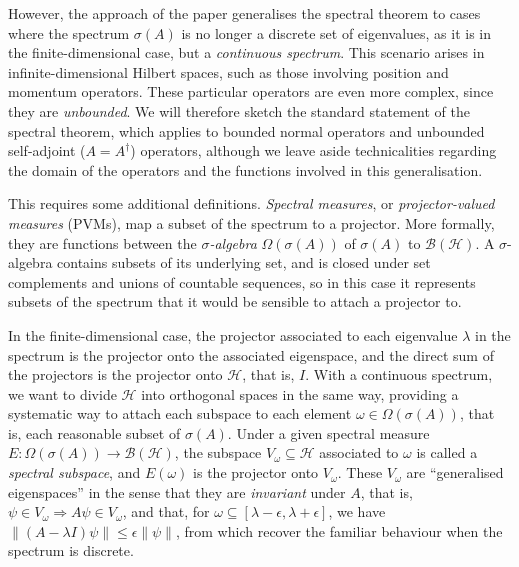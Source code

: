 \documentclass[10pt, a4paper]{article}
\newcommand{\norm}[1]{\left\lVert#1\right\rVert}
\newcommand{\?}{\mathrel{?}} %
\newcommand{\Hs}{\mathcal{H}} %
\numberwithin{equation}{section} %
\theoremstyle{definition}
\theoremstyle{plain}
\theoremstyle{plain}
\begin{document}
    However, the approach of the paper generalises the spectral theorem to cases where the spectrum \(\sigma(A)\) is no longer a discrete set of eigenvalues, as it is in the finite-dimensional case, but a \emph{continuous spectrum}. This scenario arises in infinite-dimensional Hilbert spaces, such as those involving position and momentum operators. These particular operators are even more complex, since they are \emph{unbounded}. We will therefore sketch the standard statement of the spectral theorem, which applies to bounded normal operators and unbounded self-adjoint (\(A = A^{\dagger}\)) operators, although we leave aside technicalities regarding the domain of the operators and the functions involved in this generalisation.

    This requires some additional definitions. \emph{Spectral measures}, or \emph{projector-valued measures} (PVMs), map a subset of the spectrum to a projector. More formally, they are functions between the \emph{\(\sigma\)-algebra} \(\Omega(\sigma(A))\) of \(\sigma(A)\) to \(\mathcal{B}(\Hs)\). A \(\sigma\)-algebra contains subsets of its underlying set, and is closed under set complements and unions of countable sequences, so in this case it represents subsets of the spectrum that it would be sensible to attach a projector to.

    In the finite-dimensional case, the projector associated to each eigenvalue \(\lambda\) in the spectrum is the projector onto the associated eigenspace, and the direct sum of the projectors is the projector onto \(\Hs\), that is, \(I\). With a continuous spectrum, we want to divide \(\Hs\) into orthogonal spaces in the same way, providing a systematic way to attach each subspace to each element \(\omega \in \Omega(\sigma(A))\), that is, each reasonable subset of \(\sigma(A)\). Under a given spectral measure \(E : \Omega(\sigma(A)) \to \mathcal{B}(\Hs)\), the subspace \(V_{\omega} \subseteq \Hs\) associated to \(\omega\) is called a \emph{spectral subspace}, and \(E(\omega)\) is the projector onto \(V_{\omega}\). These \(V_{\omega}\) are ``generalised eigenspaces'' in the sense that they are \emph{invariant} under \(A\), that is, \(\psi \in V_{\omega} \Rightarrow A\psi \in V_{\omega}\), and that, for \(\omega \subseteq [\lambda - \epsilon, \lambda + \epsilon]\), we have \(\norm{(A - \lambda I)\psi} \leq \epsilon\norm{\psi}\), from which recover the familiar behaviour when the spectrum is discrete.
\end{document}
